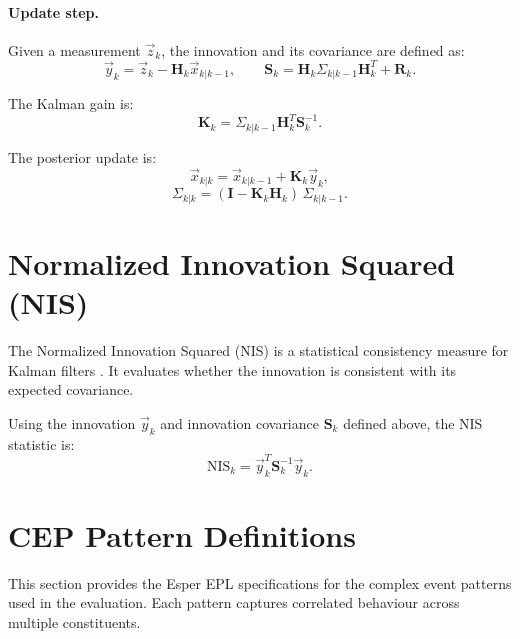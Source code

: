 \paragraph{Update step.}
Given a measurement $\vec{z}_k$, the innovation and its covariance are defined as:
\[
\vec{y}_k = \vec{z}_k - \mathbf{H}_k \vec{x}_{k|k-1},
\qquad
\mathbf{S}_k = \mathbf{H}_k \Sigma_{k|k-1} \mathbf{H}_k^{T} + \mathbf{R}_k.
\]

The Kalman gain is:
\[
\mathbf{K}_k = \Sigma_{k|k-1} \mathbf{H}_k^{T} \mathbf{S}_k^{-1}.
\]

The posterior update is:
\[
\vec{x}_{k|k} = \vec{x}_{k|k-1} + \mathbf{K}_k \vec{y}_k,
\]
\[
\Sigma_{k|k} = (\mathbf{I} - \mathbf{K}_k \mathbf{H}_k)\,\Sigma_{k|k-1}.
\]

\section{Normalized Innovation Squared (NIS)}
\label{sec:predictor-confidence}

The Normalized Innovation Squared (NIS) is a statistical consistency measure for Kalman filters \cite{bar-shalom2001estimation,simon2006optimal}. It evaluates whether the innovation is consistent with its expected covariance.

Using the innovation $\vec{y}_k$ and innovation covariance $\mathbf{S}_k$ defined above, the NIS statistic is:
\[
\mathrm{NIS}_k =
\vec{y}_k^{T} \mathbf{S}_k^{-1} \vec{y}_k.
\]


\section{CEP Pattern Definitions}\label{app:patterns}
This section provides the Esper EPL specifications for the complex event patterns used in the evaluation. Each pattern captures correlated behaviour across multiple constituents.

